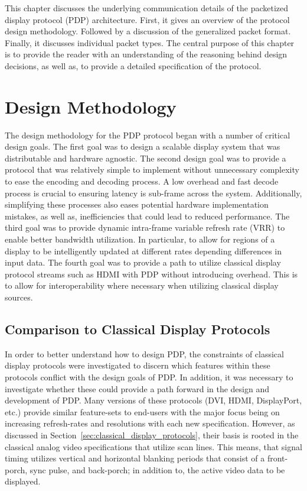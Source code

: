 \label{chap:pdp_protocol}

This chapter discusses the underlying communication details of the packetized display protocol (PDP) architecture. First, it gives an overview of the protocol design methodology. Followed by a discussion of the generalized packet format. Finally, it discusses individual packet types. The central purpose of this chapter is to provide the reader with an understanding of the reasoning behind design decisions, as well as, to provide a detailed specification of the protocol.

\section{Design Methodology}
    The design methodology for the PDP protocol began with a number of critical design goals. The first goal was to design a scalable display system that was distributable and hardware agnostic. The second design goal was to provide a protocol that was relatively simple to implement without unnecessary complexity to ease the encoding and decoding process. A low overhead and fast decode process is crucial to ensuring latency is sub-frame across the system. Additionally, simplifying these processes also eases potential hardware implementation mistakes, as well as, inefficiencies that could lead to reduced performance. The third goal was to provide dynamic intra-frame variable refresh rate (VRR) to enable better bandwidth utilization. In particular, to allow for regions of a display to be intelligently updated at different rates depending differences in input data. The fourth goal was to provide a path to utilize classical display protocol streams such as HDMI with PDP without introducing overhead. This is to allow for interoperability where necessary when utilizing classical display sources.

    \subsection{Comparison to Classical Display Protocols}
        In order to better understand how to design PDP, the constraints of classical display protocols were investigated to discern which features within these protocols conflict with the design goals of PDP. In addition, it was necessary to investigate whether these could provide a path forward in the design and development of PDP. Many versions of these protocols (DVI\cite{DDWG1999}, HDMI\cite{HDMIForum2018}, DisplayPort\cite{VESA2016}, etc.) provide similar feature-sets to end-users with the major focus being on increasing refresh-rates and resolutions with each new specification. However, as discussed in Section~\ref{sec:classical_display_protocols}, their basis is rooted in the classical analog video specifications that utilize scan lines\cite{Neal1998}. This means, that signal timing utilizes vertical and horizontal blanking periods that consist of a front-porch, sync pulse, and back-porch; in addition to, the active video data to be displayed.

